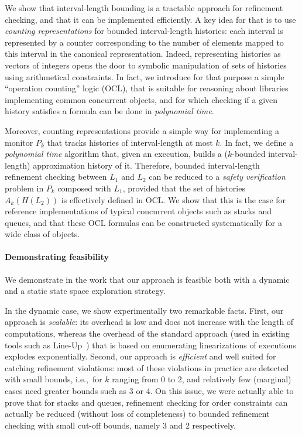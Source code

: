 We show that interval-length bounding is a tractable approach for refinement
checking, and that it can be implemented efficiently. A key idea for that is to
use \emph{counting representations} for bounded interval-length histories: each
interval is represented by a counter corresponding to the number of elements
mapped to this interval in the canonical representation. Indeed, representing
histories as vectors of integers opens the door to symbolic manipulation of
sets of histories using arithmetical constraints. In fact, we introduce for
that purpose a simple ``operation counting'' logic (OCL), that is
suitable for reasoning about libraries implementing common concurrent objects,
and for which checking if a given history satisfies a formula can be done in
\emph{polynomial time}.

Moreover, counting representations provide a simple way for implementing a
monitor $P_k$ that tracks histories of interval-length at most $k$. In fact, we
define a \emph{polynomial time} algorithm that, given an execution, builds a
($k$-bounded interval-length) approximation history of it. Therefore, bounded
interval-length refinement checking between $L_1$ and $L_2$ can be reduced to a
\emph{safety verification} problem in $P_k$ composed with
$L_1$, provided that the set of histories $A_k(H(L_2))$ is effectively defined
in OCL. We show that this is the case for reference implementations of typical
concurrent objects such as stacks and queues, and that these OCL formulas can
be constructed systematically for a wide class of objects.

\paragraph{Demonstrating feasibility}


We demonstrate in the work that our approach is feasible both with a dynamic
and a static state space exploration strategy.

In the dynamic case, we show experimentally two remarkable facts. First, our
approach is \emph{scalable}: its overhead is low and does not increase with the
length of computations, whereas the overhead of the standard approach (used in
existing tools such as Line-Up~\cite{conf/pldi/BurckhardtDMT10}) that is based
on enumerating linearizations of executions explodes exponentially. Second, our
approach is \emph{efficient} and well suited for catching refinement
violations: most of these violations in practice are detected with small
bounds, i.e.,~for $k$ ranging from 0 to $2$, and relatively few (marginal)
cases need greater bounds such as 3 or 4. On this issue, we were actually able
to prove that for stacks and queues, refinement checking for order constraints
can actually be reduced (without loss of completeness) to bounded refinement
checking with small cut-off bounds, namely 3 and 2 respectively.

